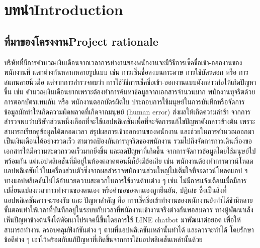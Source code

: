\chapter{\ifcpe บทนำ\else Introduction\fi}

\section{\ifcpe ที่มาของโครงงาน\else Project rationale\fi}
\enskip บริษัทที่มีการคำนวณเงินเดือนจากเวลาการทำงานของพนักงานจะมีวิธีการเช็คชื่อเข้า-ออกงานของพนักงานที่ 
แตกต่างกันหลากหลายรูปแบบ เช่น การเซ็นชื่อลงบนกระดาษ การใช้บัตรตอก หรือ การสแกนลายนิ้วมือ
แต่จากการสำรวจพบว่า การใช้วิธีการเช็คชื่อเข้า-ออกงานแบบดังกล่าวก่อให้เกิดปัญหาขึ้น 
เช่น คำนวณเงินเดือนยากเพราะต้องทำการค้นหาข้อมูลจากเอกสารจำนวนมาก 
พนักงานทุจริตด้วยการตอกบัตรแทนกัน 
หรือ พนักงานตอกบัตรผิดใบ 
ประกอบการใช้มนุษย์ในการบันทึกหรือจัดการข้อมูลมักทำให้เกิดความผิดพลาดที่เกิดจากมนุษย์ (human error) 
ส่งผลให้เกิดความล่าช้า 
\enskip จากการสำรวจพบว่าบริษัทส่วนหนึ่งเลือกที่จะใช้แอปพลิเคชันเพื่อที่จะจัดการแก้ไขปัญหาดังกล่าวข้างต้น 
เพราะสามารถเรียกดูข้อมูลได้ตลอดเวลา สรุปผลการเข้าออกงานของพนักงาน และช่วยในการคํานวณออกมาเป็นเงินเดือนได้อย่างรวดเร็ว 
สามารถป้องกันการทุจริตของพนักงาน รวมไปถึงจัดการการเดินเรื่องขอเอกสารให้มีความสะดวกรวดเร็วมากยิ่งขึ้น และลดปัญหาที่เกิดขึ้น
จากการจัดการข้อมูลโดยใช้มนุษย์ไปพร้อมกัน 
แต่แอปพลิเคชันที่มีอยู่ในท้องตลาดตอนนี้ก็ยังมีข้อเสีย เช่น 
พนักงานต้องทำการดาวน์โหลดแอปพลิเคชันไว้ในเครื่องส่วนตัวซึ่งจากผลสำรวจพนักงานส่วนใหญ่ไม่เต็มใจที่จะดาวน์โหลดแอป ฯ 
บางแอปพลิเคชันไม่ได้อํานวยความสะดวกในการใช้งานด้านต่าง ๆ เช่น ไม่มีการแจ้งเตือนเมื่อมีการ
เปลี่ยนแปลงเวลาการทำงานของตนเอง หรือคําขอของตนเองถูกยืนยัน, ปฏิเสธ ซึ่งเป็นสิ่งที่แอปพลิเคชันควรจะรองรับ และ 
ปัญหาสำคัญ คือ การเช็คชื่อเข้าทำงานของพนักงานยังทำได้ช้ามีหลายขั้นตอนทำให้เวลาที่บันทึกอยู่ในระบบกับเวลาที่พนักงานเข้างานจริงต่างกันพอสมควร
\enskip ทางผู้พัฒนาเล็งเห็นปัญหาข้างต้นจึงได้พัฒนาโปรเจคนี้ขึ้นโดยการใช้ LINE chatbot มาพัฒนาต่อยอด
เพื่อให้สามารถทำงาน ครอบคลุมฟังก์ชันต่าง ๆ ตามที่แอปพลิเคชันเหล่านั้นทำได้ และควรจะทำได้
โดยรักษาข้อดีต่าง ๆ เอาไว้พร้อมกับแก้ปัญหาที่เกิดขึ้นจากการใช้แอปพลิเคชันเหล่านั้นด้วย




